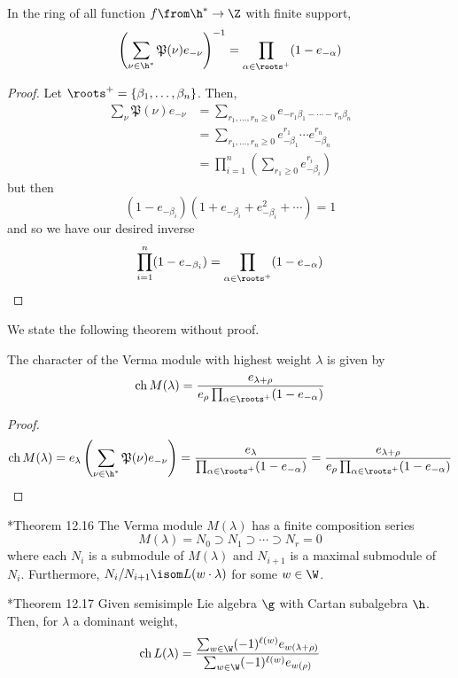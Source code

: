 \documentclass[11pt,leqno,oneside]{amsart}
\numberwithin{thm}{section}
\newcommand{\ch}{\operatorname{ch}}
\newcommand{\halfsum}{\rho}
\newcommand{\numposrootcombos}{\mathfrak{P}}
\begin{document}
\begin{lem}
  In the ring of all function \(f \from \h^* \to \Z\) with finite
  support, \[
    \left( \sum_{\nu \in \h^*} \numposrootcombos(\nu)e_{-\nu}
    \right)^{-1} = \prod_{\alpha \in \roots^+} (1-e_{-\alpha})
  \]
\end{lem}
\begin{proof}
  Let \(\roots^+ = \{\beta_1, \ldots, \beta_n\}\). Then,
  \begin{align*}
    \sum_{\nu} \numposrootcombos(\nu) e_{-\nu}
    & = \sum_{r_1,\ldots,r_n \geq 0}
      e_{-r_1\beta_1-\cdots-r_n\beta_n}\\
    & = \sum_{r_1,\ldots,r_n \geq 0} e^{r_1}_{-\beta_1} \cdots
      e^{r_n}_{-\beta_n} \\
    & = \prod_{i=1}^n \left( \sum_{r_1 \geq 0} e^{r_i}_{-\beta_i} \right)
  \end{align*}
  but then \[
    (1-e_{-\beta_i})(1+e_{-\beta_i}+e_{-\beta_i}^2+\cdots) = 1
  \]
  and so we have our desired inverse \[
    \prod_{i=1}^n (1-e_{-\beta_i}) = \prod_{\alpha \in
      \roots^+}(1-e_{-\alpha}) 
  \]
\end{proof}
We state the following theorem without proof.
\begin{thm}
  The character of the Verma module with highest weight \(\lambda\)
  is given by \[
    \ch M(\lambda) = \frac{e_{\lambda+\halfsum}}{e_{\halfsum}
      \prod_{\alpha \in \roots^+}(1-e_{-\alpha})}
  \]
\end{thm}
\begin{proof}
  \[
    \ch M(\lambda) = e_{\lambda} \left(\sum_{\nu \in \h^*}
      \numposrootcombos(\nu)e_{-\nu} \right) =
    \frac{e_{\lambda}}{\prod_{\alpha \in \roots^+}(1-e_{-\alpha})} =
    \frac{e_{\lambda+\halfsum}}{e_{\halfsum} \prod_{\alpha \in
        \roots^+}(1-e_{-\alpha})} 
  \]
\end{proof}
\begin{thm}
  \cite{carter}*{Theorem 12.16} The Verma module \(M(\lambda)\) has a
  finite composition series \[ 
    M(\lambda) = N_0 \supset N_1 \supset \cdots \supset N_r = 0
  \]
  where each \(N_i\) is a submodule of \(M(\lambda)\) and \(N_{i+1}\)
  is a maximal submodule of \(N_i\). Furthermore, \(N_i/N_{i+1} \isom
  L(w \cdot \lambda)\) for some \(w \in \W\). 
\end{thm}
\begin{thm}
  \cite{carter}*{Theorem 12.17} Given semisimple Lie algebra \(\g\)
  with Cartan subalgebra 
  \(\h\). Then, for \(\lambda\) a dominant weight, \[
    \ch L(\lambda) = \frac{\sum_{w \in \W} (-1)^{\ell(w)}
      e_{w(\lambda+\halfsum)}}{\sum_{w \in \W}
      (-1)^{\ell(w)}e_{w(\halfsum)}}
  \]
\end{thm}
\end{document}
